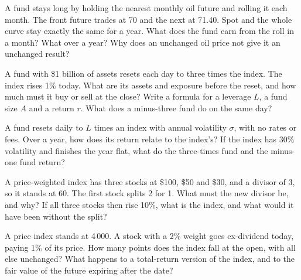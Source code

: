 \begin{question}\label{iq:iv2:etfs-futures-and-index-arbitrage:11}
A fund stays long by holding the nearest monthly oil future and rolling it each month. The front future trades at 70 and the next at 71.40. Spot and the whole curve stay exactly the same for a year. What does the fund earn from the roll in a month? What over a year? Why does an unchanged oil price not give it an unchanged result?
\end{question}

\begin{question}\label{iq:iv2:etfs-futures-and-index-arbitrage:12}
A fund with \$1 billion of assets resets each day to three times the index. The index rises 1\% today. What are its assets and exposure before the reset, and how much must it buy or sell at the close? Write a formula for a leverage $L$, a fund size $A$ and a return $r$. What does a minus-three fund do on the same day?
\end{question}

\begin{question}\label{iq:iv2:etfs-futures-and-index-arbitrage:13}
A fund resets daily to $L$ times an index with annual volatility $\sigma$, with no rates or fees. Over a year, how does its return relate to the index's? If the index has 30\% volatility and finishes the year flat, what do the three-times fund and the minus-one fund return?
\end{question}

\begin{question}\label{iq:iv2:etfs-futures-and-index-arbitrage:14}
A price-weighted index has three stocks at \$100, \$50 and \$30, and a divisor of 3, so it stands at 60. The first stock splits 2 for 1. What must the new divisor be, and why? If all three stocks then rise 10\%, what is the index, and what would it have been without the split?
\end{question}

\begin{question}\label{iq:iv2:etfs-futures-and-index-arbitrage:15}
A price index stands at 4\,000. A stock with a 2\% weight goes ex-dividend today, paying 1\% of its price. How many points does the index fall at the open, with all else unchanged? What happens to a total-return version of the index, and to the fair value of the future expiring after the date?
\end{question}

